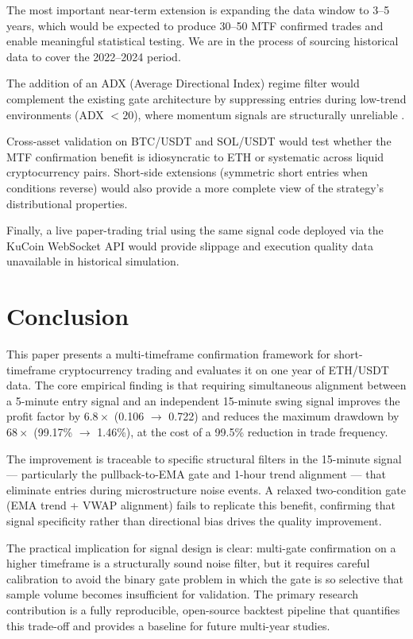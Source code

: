 \documentclass[conference]{IEEEtran}
\begin{document}
The most important near-term extension is expanding the
data window to 3--5 years, which would be expected to
produce 30--50 MTF confirmed trades and enable meaningful
statistical testing. We are in the process of sourcing
historical data to cover the 2022--2024 period.

The addition of an ADX (Average Directional Index) regime
filter would complement the existing gate architecture by
suppressing entries during low-trend environments
(ADX $< 20$), where momentum signals are structurally
unreliable \cite{wilder1978new}.

Cross-asset validation on BTC/USDT and SOL/USDT would
test whether the MTF confirmation benefit is idiosyncratic
to ETH or systematic across liquid cryptocurrency pairs.
Short-side extensions (symmetric short entries when
conditions reverse) would also provide a more complete
view of the strategy's distributional properties.

Finally, a live paper-trading trial using the same signal
code deployed via the KuCoin WebSocket API would provide
slippage and execution quality data unavailable in
historical simulation.


\section{Conclusion}
\label{sec:conclusion}

This paper presents a multi-timeframe confirmation
framework for short-timeframe cryptocurrency trading and
evaluates it on one year of ETH/USDT data. The core
empirical finding is that requiring simultaneous alignment
between a 5-minute entry signal and an independent
15-minute swing signal improves the profit factor by
$6.8\times$ (0.106 $\to$ 0.722) and reduces the maximum
drawdown by $68\times$ (99.17\% $\to$ 1.46\%), at the cost
of a 99.5\% reduction in trade frequency.

The improvement is traceable to specific structural filters
in the 15-minute signal — particularly the pullback-to-EMA
gate and 1-hour trend alignment — that eliminate entries
during microstructure noise events. A relaxed two-condition
gate (EMA trend + VWAP alignment) fails to replicate this
benefit, confirming that signal specificity rather than
directional bias drives the quality improvement.

The practical implication for signal design is clear:
multi-gate confirmation on a higher timeframe is a
structurally sound noise filter, but it requires careful
calibration to avoid the binary gate problem in which
the gate is so selective that sample volume becomes
insufficient for validation. The primary research
contribution is a fully reproducible, open-source backtest
pipeline that quantifies this trade-off and provides a
baseline for future multi-year studies.
\end{document}

